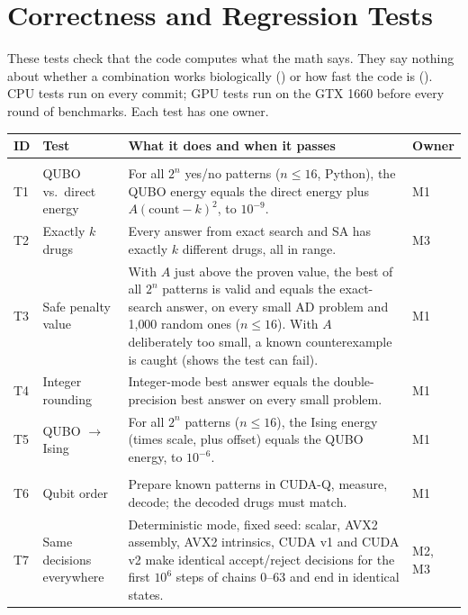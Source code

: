 \section{Correctness and Regression Tests}
\label{app:tests}

These tests check that the code computes what the math says. They say nothing about whether a combination works biologically () or how fast the code is (). CPU tests run on every commit; GPU tests run on the GTX 1660 before every round of benchmarks. Each test has one owner.

\begin{longtable}{>{\raggedright\arraybackslash}p{0.7cm}>{\raggedright\arraybackslash}p{3.4cm}>{\raggedright\arraybackslash}p{8.0cm}>{\raggedright\arraybackslash}p{1.2cm}}
\toprule
ID & Test & What it does and when it passes & Owner \\
\midrule
\endhead
\multicolumn{4}{l}{\textit{Scoring function}} \\
T1 & QUBO vs.\ direct energy & For all $2^n$ yes/no patterns ($n\le 16$, Python), the QUBO energy equals the direct energy plus $A(\text{count}-k)^2$, to $10^{-9}$. & M1 \\
T2 & Exactly $k$ drugs & Every answer from exact search and SA has exactly $k$ different drugs, all in range. & M3 \\
T3 & Safe penalty value & With $A$ just above the proven value, the best of all $2^n$ patterns is valid and equals the exact-search answer, on every small AD problem and 1{,}000 random ones ($n\le 16$). With $A$ deliberately too small, a known counterexample is caught (shows the test can fail). & M1 \\
T4 & Integer rounding & Integer-mode best answer equals the double-precision best answer on every small problem. & M1 \\
T5 & QUBO $\to$ Ising & For all $2^n$ patterns ($n\le 16$), the Ising energy (times scale, plus offset) equals the QUBO energy, to $10^{-6}$. & M1 \\
\multicolumn{4}{l}{\textit{Solvers}} \\
T6 & Qubit order & Prepare known patterns in CUDA-Q, measure, decode; the decoded drugs must match. & M1 \\
T7 & Same decisions everywhere & Deterministic mode, fixed seed: scalar, AVX2 assembly, AVX2 intrinsics, CUDA v1 and CUDA v2 make identical accept/reject decisions for the first $10^6$ steps of chains 0--63 and end in identical states. & M2, M3 \\

\end{longtable}
